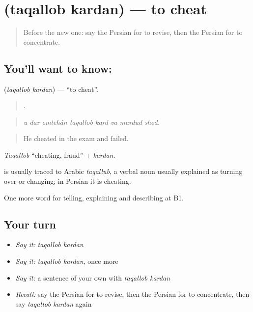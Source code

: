 \section[\texorpdfstring{\fa{تقلب} \fa{کردن} (taqallob kardan)}{تقلب کردن (taqallob kardan)}]{  (taqallob kardan) — to cheat}

\label{lesson:FA-C401-taqallob-kardan}



\begin{quote}
Before the new one: say the Persian for to revise, then the Persian for to concentrate.
\end{quote}

\subsection*{You'll want to know:  }
\textbf{ } (\emph{taqallob kardan}) — \textquotedblleft{}to cheat\textquotedblright{}.

\begin{quote}
       .
\end{quote}

\begin{quote}
\emph{u dar emtehân taqallob kard va mardud shod.}
\end{quote}

\begin{quote}
He cheated in the exam and failed.
\end{quote}

\emph{Taqallob} \textquotedblleft{}cheating, fraud\textquotedblright{} + \emph{kardan}.

\begin{cousinweb}
\textbf{} is usually traced to Arabic \emph{taqallub}, a verbal noun usually explained as turning over or changing; in Persian it is cheating.
\end{cousinweb}

\begin{grammarlens}[title={What you've built}]
One more word for telling, explaining and describing at B1.
\end{grammarlens}

\subsection*{Your turn}
\begin{itemize}
\raggedright
  \item \emph{Say it:} \emph{taqallob kardan}
  \item \emph{Say it:} \emph{taqallob kardan}, once more
  \item \emph{Say it:} a sentence of your own with \emph{taqallob kardan}
  \item \emph{Recall:} say the Persian for to revise, then the Persian for to concentrate, then say \emph{taqallob kardan} again
\end{itemize}

